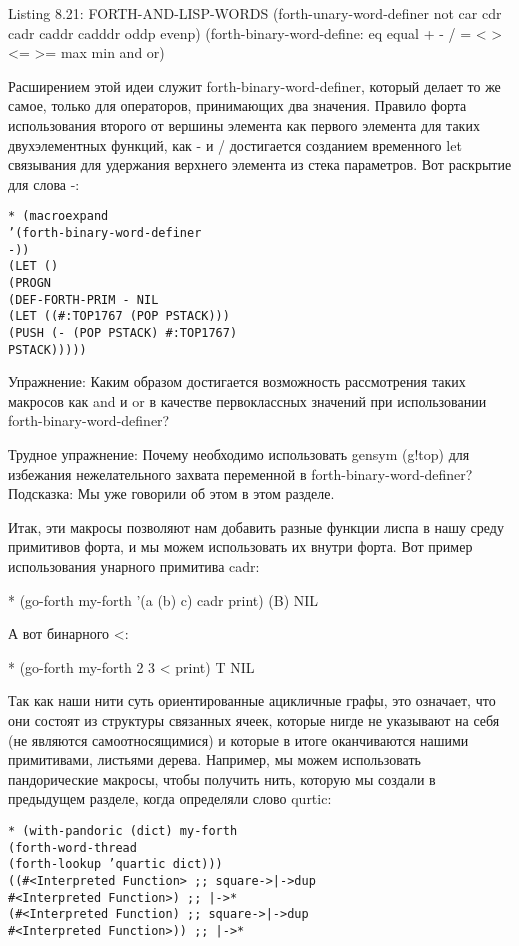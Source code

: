 {{{Listing 8.21: FORTH-AND-LISP-WORDS
(forth-unary-word-definer
not car cdr cadr caddr cadddr
oddp evenp)
(forth-binary-word-define:
eq equal + - / = < > <= >=
max min and or)

Расширением этой идеи служит forth-binary-word-definer, который делает то же самое, только для операторов, принимающих два значения. Правило форта использования второго от вершины элемента как первого элемента для таких двухэлементных функций, как - и / достигается созданием временного let связывания для удержания верхнего элемента из стека параметров. Вот раскрытие для слова -:

\begin{verbatim}
* (macroexpand
’(forth-binary-word-definer
-))
(LET ()
(PROGN
(DEF-FORTH-PRIM - NIL
(LET ((#:TOP1767 (POP PSTACK)))
(PUSH (- (POP PSTACK) #:TOP1767)
PSTACK)))))
\end{verbatim}

Упражнение: Каким образом достигается возможность рассмотрения таких макросов как and и or в качестве первоклассных значений при использовании forth-binary-word-definer?

Трудное упражнение: Почему необходимо использовать gensym (g!top) для избежания нежелательного захвата переменной в forth-binary-word-definer? Подсказка: Мы уже говорили об этом в этом разделе.

Итак, эти макросы позволяют нам добавить разные функции лиспа в нашу среду примитивов форта, и мы можем использовать их внутри форта. Вот пример использования унарного примитива cadr:

* (go-forth my-forth
’(a (b) c) cadr print)
(B)
NIL

А вот  бинарного <:

* (go-forth my-forth
2 3 < print)
T
NIL

Так как наши нити суть ориентированные ацикличные графы, это означает, что они состоят из структуры связанных ячеек, которые нигде не указывают на себя (не являются самоотносящимися) и которые в итоге оканчиваются нашими примитивами, листьями дерева. Например, мы можем использовать пандорические макросы, чтобы получить нить, которую мы создали в предыдущем разделе, когда определяли слово qurtic:

\begin{verbatim}
* (with-pandoric (dict) my-forth
(forth-word-thread
(forth-lookup ’quartic dict)))
((#<Interpreted Function> ;; square->|->dup
#<Interpreted Function>) ;; |->*
(#<Interpreted Function) ;; square->|->dup
#<Interpreted Function>)) ;; |->*
\end{verbatim}

}}}
